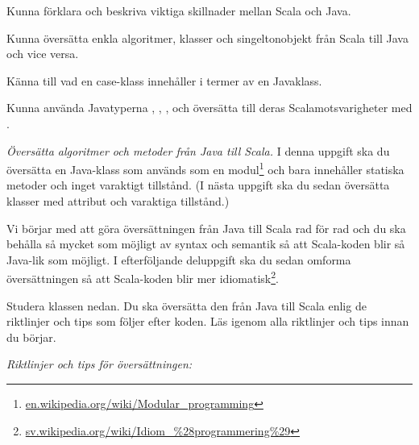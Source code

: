 

\Exercise{\ExeWeekELEVEN}\label{exe:W11}

\begin{Goals}
\item Kunna förklara och beskriva viktiga skillnader mellan Scala och Java.
\item Kunna översätta enkla algoritmer, klasser och singeltonobjekt från Scala till Java och vice versa.
\item Känna till vad en case-klass innehåller i termer av en Javaklass.
\item Kunna använda Javatyperna , , ,  och översätta till deras Scalamotsvarigheter med .
\end{Goals}

\begin{Preparations}
\item {} 
\end{Preparations}

\BasicTasks %

\Task \emph{Översätta algoritmer och metoder från Java till Scala.} I denna uppgift ska du översätta en Java-klass som används som en modul\footnote{\href{https://en.wikipedia.org/wiki/Modular_programming}{en.wikipedia.org/wiki/Modular\_programming}} och bara innehåller statiska metoder och inget varaktigt tillstånd. (I nästa uppgift ska du sedan översätta klasser med attribut och varaktiga tillstånd.) 

Vi börjar med att göra översättningen från Java till Scala rad för rad och du ska behålla så mycket som möjligt av syntax och semantik så att Scala-koden blir så Java-lik som möjligt. I efterföljande deluppgift ska du sedan omforma översättningen så att Scala-koden blir mer idiomatisk\footnote{\href{https://sv.wikipedia.org/wiki/Idiom_\%28programmering\%29}{sv.wikipedia.org/wiki/Idiom\_\%28programmering\%29}}.

\Subtask Studera klassen  nedan. Du ska översätta den från Java till Scala enlig de riktlinjer och tips som följer efter koden. Läs igenom alla riktlinjer och tips innan du börjar.


\noindent\emph{Riktlinjer och tips för översättningen:}

